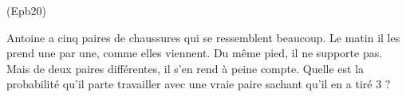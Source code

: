 \begin{tiny}(Epb20)\end{tiny} Antoine a cinq paires de chaussures qui se ressemblent beaucoup. Le matin il les prend une par une, comme elles viennent. Du même pied, il ne supporte pas. Mais de deux paires différentes, il s'en rend à peine compte. Quelle est la probabilité qu'il parte travailler avec une vraie paire sachant qu'il en a tiré 3 ?